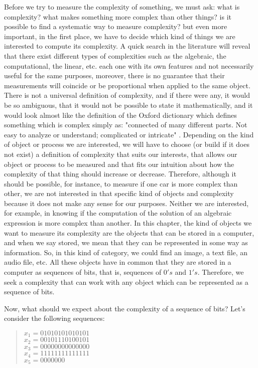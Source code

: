 Before we try to measure the complexity of something, we must ask: what is complexity? what makes something more complex than other things? is it possible to find a systematic way to measure complexity? but even more important, in the first place, we have to decide which kind of things we are interested to compute its complexity.  A quick search in the literature will reveal that there exist different types of complexities such as the algebraic, the computational, the linear, etc. each one with its own features and not necessarily useful for the same purposes, moreover, there is no guarantee that their measurements will coincide or be proportional when applied to the same object. There is not a universal definition of complexity, and if there were any, it would be so ambiguous, that it would not be possible to state it mathematically, and it would look almost like the definition of the Oxford dictionary which defines something which is complex simply as: "connected of many different parts. Not easy to analyze or understand; complicated or intricate" \cite{complex}. Depending on the kind of object or process we are interested, we will have to choose (or build if it does not exist) a definition of complexity that suits our interests, that allows our object or process to be measured and that fits our intuition about how the complexity of that thing should increase or decrease. Therefore, although it should be possible, for instance, to measure if one car is more complex than other, we are not interested in that specific kind of objects and complexity because it does not make any sense for our purposes. Neither we are interested, for example, in knowing if the computation of the solution of an algebraic expression is more complex than another. In this chapter, the kind of objects we want to measure its complexity are the objects that can be stored in a computer, and when we say stored, we mean that they can be represented in some way as information. So, in this kind of category, we could find an image, a text file, an audio file, etc. All these objects have in common that they are stored in a computer as sequences of bits, that is, sequences of $0's$ and $1's$. Therefore, we seek a complexity that can work with any object which can be represented as a sequence of bits. 

Now, what should we expect about the complexity of a sequence of bits? Let's consider the following sequences:
\begin{quote}
\centering
$x_{1}=01010101010101$\\
$x_{2}=00101110100101$\\
$x_{3}=00000000000000$\\
$x_{4}=11111111111111$\\
$x_{5}=0000000$
\end{quote}

